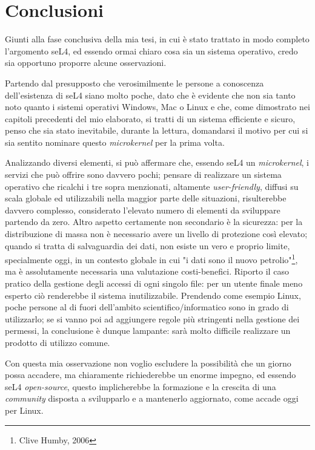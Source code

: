 \chapter{Conclusioni}
Giunti alla fase conclusiva della mia tesi, in cui è stato trattato in modo completo l'argomento seL4, ed essendo ormai chiaro cosa sia un sistema operativo, credo sia opportuno proporre alcune osservazioni.

Partendo dal presupposto che verosimilmente le persone a conoscenza dell'esistenza di seL4 siano molto poche, dato che è evidente che non sia tanto noto quanto i sistemi operativi Windows, Mac o Linux e che, come dimostrato nei capitoli precedenti del mio elaborato, si tratti di un sistema efficiente e sicuro, penso che sia stato inevitabile, durante la lettura, domandarsi il motivo per cui si sia sentito nominare questo \textit{microkernel} per la prima volta.

Analizzando diversi elementi, si può affermare che, essendo seL4 un \textit{microkernel}, i servizi che può offrire sono davvero pochi; pensare di realizzare un sistema operativo che ricalchi i tre sopra menzionati, altamente \textit{user-friendly}, diffusi su scala globale ed utilizzabili nella maggior parte delle situazioni, risulterebbe davvero complesso, considerato l'elevato numero di elementi da sviluppare partendo da zero. Altro aspetto certamente non secondario è la sicurezza: per la distribuzione di massa non è necessario avere un livello di protezione così elevato; quando si tratta di salvaguardia dei dati, non esiste un vero e proprio limite, specialmente oggi, in un contesto globale in cui "i dati sono il nuovo petrolio"\footnote{Clive Humby, 2006}, ma è assolutamente necessaria una valutazione costi-benefici. Riporto il caso pratico della gestione degli accessi di ogni singolo file: per un utente finale meno esperto ciò renderebbe il sistema inutilizzabile. Prendendo come esempio Linux, poche persone al di fuori dell'ambito scientifico/informatico sono in grado di utilizzarlo; se si vanno poi ad aggiungere regole più stringenti nella gestione dei permessi, la conclusione è dunque lampante: sarà molto difficile realizzare un prodotto di utilizzo comune.

Con questa mia osservazione non voglio escludere la possibilità che un giorno possa accadere, ma chiaramente richiederebbe un enorme impegno, ed essendo seL4 \textit{open-source}, questo implicherebbe la formazione e la crescita di una \textit{community} disposta a svilupparlo e a mantenerlo aggiornato, come accade oggi per Linux.

